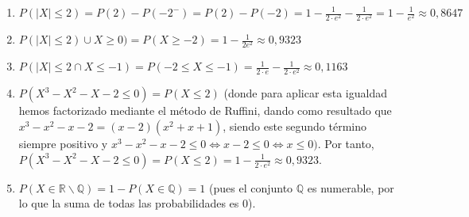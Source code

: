 	\begin{enumerate}
		\item $P(|X| \leq 2) = P(2) - P(-2^-) = P(2) - P(-2) = 1 - \frac{1}{2·e^2} - \frac{1}{2·e^2} = 1 - \frac{1}{e^2} \approx 0,8647$
		
		\item $P(|X| \leq 2) \cup X \geq 0) = P(X \geq -2) = 1 - \frac{1}{2e^2} \approx 0,9323$
		
		\item $P(|X| \leq 2 \cap X \leq -1) = P(-2 \leq X \leq -1) = \frac{1}{2·e} - \frac{1}{2·e^2} \approx 0,1163$
		
		\item $P(X^3-X^2-X-2 \leq 0) = P(X \leq 2)$ (donde para aplicar esta igualdad hemos factorizado mediante el método de Ruffini, dando como resultado que $x^3-x^2-x-2 = (x-2)(x^2+x+1)$, siendo este segundo término siempre positivo y $x^3-x^2-x-2 \leq 0 \iff x-2 \leq 0 \iff x \leq 0)$. Por tanto, $P(X^3-X^2-X-2 \leq 0) = P(X \leq 2) = 1 - \frac{1}{2·e^2} \approx 0,9323$. 
		
		\item $P(X \in \mathbb{R} \backslash \mathbb{Q}) = 1 - P(X \in \mathbb{Q}) = 1$ (pues el conjunto $\mathbb{Q}$ es numerable, por lo que la suma de todas las probabilidades es 0). 
	\end{enumerate}
